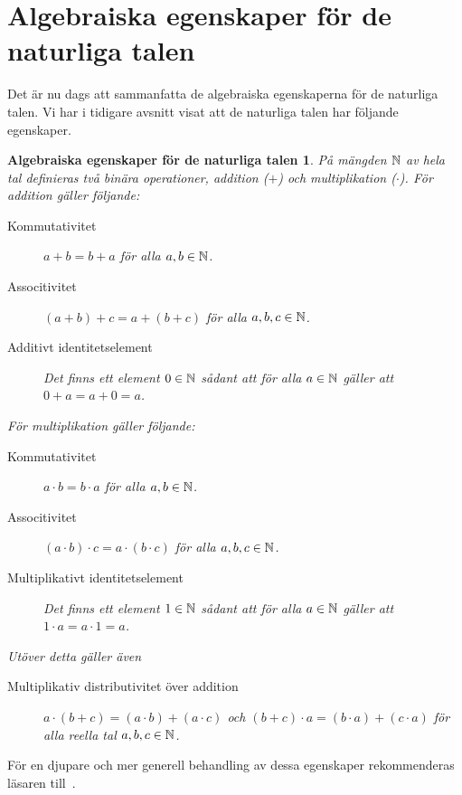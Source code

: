 \section{Algebraiska egenskaper för de naturliga talen}%
\label{sec:HeltalensAlgebraiskaEgenskaper}
Det är nu dags att sammanfatta de algebraiska egenskaperna för de
naturliga talen.
Vi har i tidigare avsnitt visat att de naturliga talen har följande egenskaper.

\theoremstyle{plain}
\newtheorem*{AlgebraicPropertiesNatural}{Algebraiska egenskaper för de
  naturliga talen}
\begin{AlgebraicPropertiesNatural}\label{def:HeltalenEgenskaper}
  På mängden \(\mathbb{N}\) av hela tal definieras två binära operationer,
  addition (\(+\)) och multiplikation (\(\cdot\)).
  För addition gäller följande:
  \begin{description}
    \item[Kommutativitet] \(a+b=b+a\) för alla \(a,b\in\mathbb{N}\).
    \item[Associtivitet] \((a+b)+c=a+(b+c)\) för alla \(a,b,c\in\mathbb{N}\).
    \item[Additivt identitetselement] Det finns ett element \(0\in\mathbb{N}\)
      sådant att för alla \(a\in\mathbb{N}\) gäller att \(0+a = a+0 = a\).
  \end{description}
  För multiplikation gäller följande:
  \begin{description}
    \item[Kommutativitet] \(a \cdot b=b \cdot a\) för alla \(a,b\in\mathbb{N}\).
    \item[Associtivitet] \((a \cdot b) \cdot c=a \cdot (b \cdot c)\) för
      alla \(a,b,c\in\mathbb{N}\).
    \item[Multiplikativt identitetselement] Det finns ett element
      \(1\in\mathbb{N}\) sådant att för alla \(a\in\mathbb{N}\) gäller att
      \(1 \cdot a = a \cdot 1 = a\).
  \end{description}
  Utöver detta gäller även
  \begin{description}
    \item[Multiplikativ distributivitet över addition]
      \(a \cdot (b+c) = (a \cdot b) + (a \cdot c)\) och
      \((b+c) \cdot a = (b \cdot a) + (c \cdot a)\) för alla reella tal
      \(a,b,c\in\mathbb{N}\).
  \end{description}
\end{AlgebraicPropertiesNatural}

För en djupare och mer generell behandling av dessa egenskaper rekommenderas 
läsaren till~\cite{Bartle2000itr,Grillet2007aa}.


